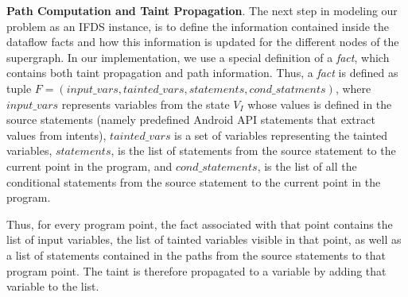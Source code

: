 
\noindent
\textbf{Path Computation and Taint Propagation}.
The next step in modeling our problem as an IFDS instance, is to define the information contained inside the dataflow facts and how this information is updated for the different nodes of the supergraph. In our implementation, we use a special definition of a \emph{fact}, which contains both taint propagation and path information. Thus, a \emph{fact} is defined as tuple $F = (input\_vars, tainted\_vars, statements, cond\_statments)$, where $input\_vars$ represents variables from the state $V_I$ whose values is defined in the source statements (namely predefined Android API statements that extract values from intents), $tainted\_vars$ is a set of variables representing the tainted variables, $statements$, is the list of statements from the source statement to the current point in the program, and $cond\_statements$, is the list of all the conditional statements from the source statement to the current point in the program. 

{\color{orange}
Thus, for every program point, the fact associated with that point contains the list of input variables, the list of tainted variables visible in that point, as well as a list of statements contained in the paths from the source statements to that program point. The taint is therefore propagated to a variable by adding that variable to the list.
} 

